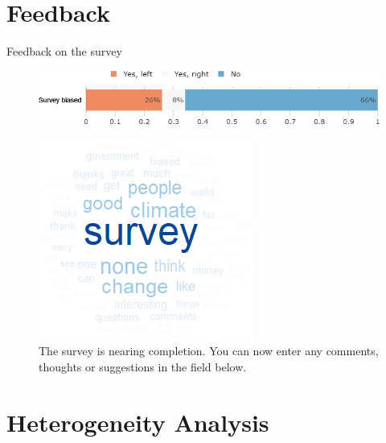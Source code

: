 \documentclass[aspectratio=169,9pt,dvipsnames]{beamer}
\begin{document}
\section{Feedback}
\begin{frame}{Feedback on the survey}%
\vspace{-.2cm}
\begin{figure}[h!]
\caption{Do you feel that this survey was politically biased?}
\includegraphics[width=.6\textwidth]{../figures/US/survey_biased_US.png} \\
\vspace{.5cm}
\caption{The survey is nearing completion. You can now enter any comments, thoughts or suggestions in the field below.}
\includegraphics[width=.3\textwidth]{../figures/US/comment_field_US.png}
\end{figure}
\end{frame}

\section{Heterogeneity Analysis}
\end{document}
